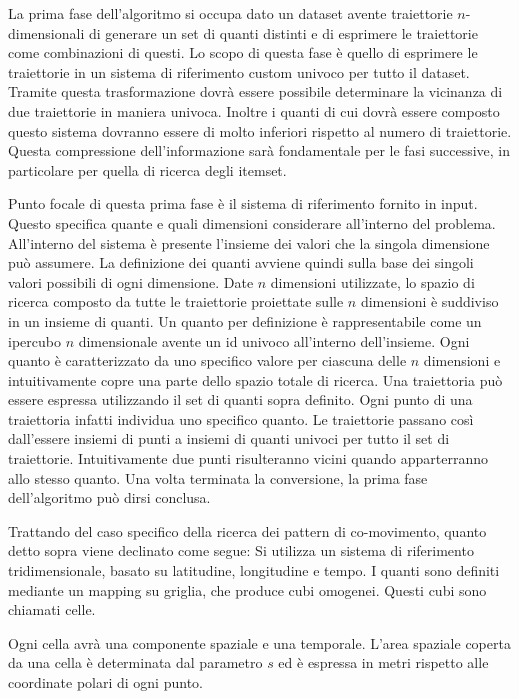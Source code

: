 La prima fase dell'algoritmo si occupa dato un dataset avente traiettorie \(n\)-dimensionali di generare un set di quanti distinti e di esprimere le traiettorie come combinazioni di questi.
Lo scopo di questa fase è quello di esprimere le traiettorie in un sistema di riferimento custom univoco per tutto il dataset.
Tramite questa trasformazione dovrà essere possibile determinare la vicinanza di due traiettorie in maniera univoca.
Inoltre i quanti di cui dovrà essere composto questo sistema dovranno essere di molto inferiori rispetto al numero di traiettorie.
Questa compressione dell'informazione sarà fondamentale per le fasi successive, in particolare per quella di ricerca degli itemset.

Punto focale di questa prima fase è il sistema di riferimento fornito in input.
Questo specifica quante e quali dimensioni considerare all'interno del problema.
All'interno del sistema è presente l'insieme dei valori che la singola dimensione può assumere.
La definizione dei quanti avviene quindi sulla base dei singoli valori possibili di ogni dimensione.
Date \(n\) dimensioni utilizzate, lo spazio di ricerca composto da tutte le traiettorie proiettate sulle \(n\) dimensioni è suddiviso in un insieme di quanti.
Un quanto per definizione è rappresentabile come un ipercubo \(n\) dimensionale avente un id univoco all'interno dell'insieme.
Ogni quanto è caratterizzato da uno specifico valore per ciascuna delle \(n\) dimensioni e intuitivamente copre una parte dello spazio totale di ricerca.
Una traiettoria può essere espressa utilizzando il set di quanti sopra definito.
Ogni punto di una traiettoria infatti individua uno specifico quanto.
Le traiettorie passano così dall'essere insiemi di punti a insiemi di quanti univoci per tutto il set di traiettorie.
Intuitivamente due punti risulteranno vicini quando apparterranno allo stesso quanto.
Una volta terminata la conversione, la prima fase dell'algoritmo può dirsi conclusa.

Trattando del caso specifico della ricerca dei pattern di co-movimento, quanto detto sopra viene declinato come segue:
Si utilizza un sistema di riferimento tridimensionale, basato su latitudine, longitudine e tempo.
I quanti sono definiti mediante un mapping su griglia, che produce cubi omogenei.
Questi cubi sono chiamati celle. 

Ogni cella avrà una componente spaziale e una temporale.
L'area spaziale coperta da una cella è determinata dal parametro \(s\) ed è espressa in metri rispetto alle coordinate polari di ogni punto.

